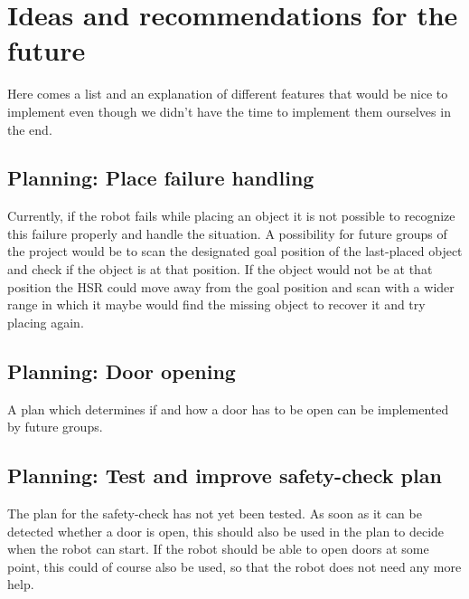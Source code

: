 \documentclass[main.tex]{subfiles}
\begin{document}
	\begingroup

	\renewcommand{\cleardoublepage}{}

	\renewcommand{\clearpage}{}

	\chapter{Ideas and recommendations for the future}
		
		Here comes a list and an explanation of different features that would be nice to implement even though we didn't have the time to implement them ourselves in the end.
		
		\section{Planning: Place failure handling}
		Currently, if the robot fails while placing an object it is not possible to recognize this failure properly and handle the situation. A possibility for future groups of the project would be to scan the designated goal position of the last-placed object and check if the object is at that position. If the object would not be at that position the HSR could move away from the goal position and scan with a wider range in which it maybe would find the missing object to recover it and try placing again.
		
		\section{Planning: Door opening}
		A plan which determines if and how a door has to be open can be implemented by future groups.
		
		\section{Planning: Test and improve safety-check plan}
		The plan for the safety-check has not yet been tested. As soon as it can be detected whether a door is open, this should also be used in the plan to decide when the robot can start. If the robot should be able to open doors at some point, this could of course also be used, so that the robot does not need any more help.
		
\end{document}
